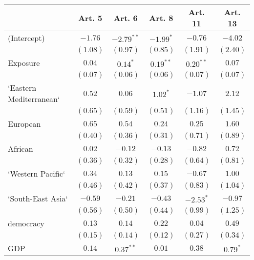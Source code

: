 
\begin{table}[!h]
\begin{center}
\begin{tabular}{l c c c c c }
\toprule
 & Art. 5 & Art. 6 & Art. 8 & Art. 11 & Art. 13 \\
\midrule
(Intercept)             & $-1.76$      & $-2.79^{**}$ & $-1.99^{*}$  & $-0.76$      & $-4.02$      \\
                        & $(1.08)$     & $(0.97)$     & $(0.85)$     & $(1.91)$     & $(2.40)$     \\
Exposure                & $0.04$       & $0.14^{*}$   & $0.19^{**}$  & $0.20^{**}$  & $0.07$       \\
                        & $(0.07)$     & $(0.06)$     & $(0.06)$     & $(0.07)$     & $(0.07)$     \\
`Eastern Mediterranean` & $0.52$       & $0.06$       & $1.02^{*}$   & $-1.07$      & $2.12$       \\
                        & $(0.65)$     & $(0.59)$     & $(0.51)$     & $(1.16)$     & $(1.45)$     \\
European                & $0.65$       & $0.54$       & $0.24$       & $0.25$       & $1.60$       \\
                        & $(0.40)$     & $(0.36)$     & $(0.31)$     & $(0.71)$     & $(0.89)$     \\
African                 & $0.02$       & $-0.12$      & $-0.13$      & $-0.82$      & $0.72$       \\
                        & $(0.36)$     & $(0.32)$     & $(0.28)$     & $(0.64)$     & $(0.81)$     \\
`Western Pacific`       & $0.34$       & $0.13$       & $0.15$       & $-0.67$      & $1.00$       \\
                        & $(0.46)$     & $(0.42)$     & $(0.37)$     & $(0.83)$     & $(1.04)$     \\
`South-East Asia`       & $-0.59$      & $-0.21$      & $-0.43$      & $-2.53^{*}$  & $-0.97$      \\
                        & $(0.56)$     & $(0.50)$     & $(0.44)$     & $(0.99)$     & $(1.25)$     \\
democracy               & $0.13$       & $0.14$       & $0.22$       & $0.04$       & $0.49$       \\
                        & $(0.15)$     & $(0.14)$     & $(0.12)$     & $(0.27)$     & $(0.34)$     \\
GDP                     & $0.14$       & $0.37^{**}$  & $0.01$       & $0.38$       & $0.79^{*}$   \\

\end{tabular}
\end{center}
\end{table}
